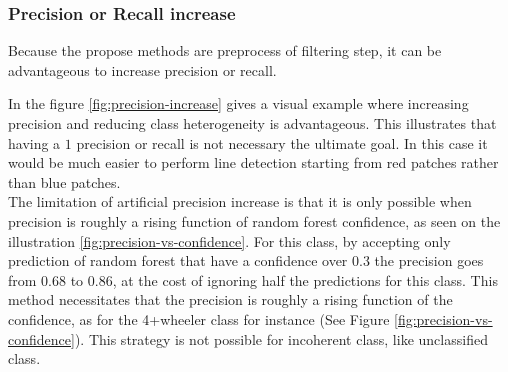 			   
		 \subsubsection{Precision or Recall increase}
			 Because the propose methods are preprocess of filtering step, it can be advantageous to increase precision or recall.
			
			In the figure \ref{fig:precision-increase} gives a visual example where increasing precision and reducing class heterogeneity is advantageous. This illustrates that having a $1$ precision or recall is not necessary the ultimate goal.
			In this case it would be much easier to perform line detection starting from red patches rather than blue patches.
			\\
			The limitation of artificial precision increase is 
			that it is only possible when precision is roughly a rising function of random forest confidence, as seen on the illustration \ref{fig:precision-vs-confidence}.
			For this class, by accepting only prediction of random forest that have a confidence over $0.3$ the precision goes from $0.68$ to $0.86$, at the cost of ignoring half the predictions for this class.
			This method necessitates that the precision is roughly a rising function of the confidence, as for the 4+wheeler class for instance (See Figure \ref{fig:precision-vs-confidence}).   
			This strategy is not possible for incoherent class, like unclassified class.
 
